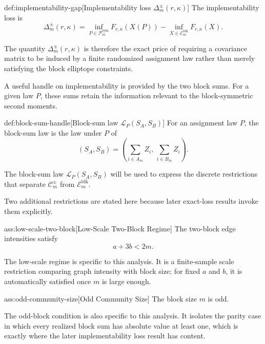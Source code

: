 \documentclass[11pt]{article}
\begin{document}
\begin{definitionv}{def:implementability-gap}[Implementability loss $\Delta_m^{\pm}(r,\kappa)$]
The implementability loss is
\[
\Delta_m^{\pm}(r,\kappa)
=
\inf_{P\in \mathcal P_m^{\mathrm{sym}}}
F_{r,\kappa}(X(P))
-
\inf_{X\in \mathcal E_m^{\mathrm{blk}}}
F_{r,\kappa}(X).
\]
\end{definitionv}

The quantity \ensuremath{\Delta_m^{\pm}(r,\kappa)} is therefore the exact price of requiring a covariance matrix to be induced by a finite randomized assignment law rather than merely satisfying the block elliptope constraints.

A useful handle on implementability is provided by the two block sums. For a given law \(P\), these sums retain the information relevant to the block-symmetric second moments.

\begin{definitionv}{def:block-sum-handle}[Block-sum law $\mathcal L_P(S_A,S_B)$]
For an assignment law $P$, the block-sum law is the law under $P$ of
\[
(S_A,S_B)
=
\left(
\sum_{i\in A_m} Z_i,\,
\sum_{i\in B_m} Z_i
\right).
\]
\end{definitionv}

The block-sum law \(\mathcal L_P(S_A,S_B)\) will be used to express the discrete restrictions that separate \(\mathcal C_m^{\pm}\) from \(\mathcal E_m^{\mathrm{blk}}\).

Two additional restrictions are stated here because later exact-loss results invoke them explicitly.

\begin{assumptionv}{ass:low-scale-two-block}[Low-Scale Two-Block Regime]
The two-block edge intensities satisfy
\[
a+3b<2m.
\]
\end{assumptionv}

The low-scale regime is specific to this analysis. It is a finite-sample scale restriction comparing graph intensity with block size; for fixed \(a\) and \(b\), it is automatically satisfied once \(m\) is large enough.

\begin{assumptionv}{ass:odd-community-size}[Odd Community Size]
The block size \(m\) is odd.
\end{assumptionv}

The odd-block condition is also specific to this analysis. It isolates the parity case in which every realized block sum has absolute value at least one, which is exactly where the later implementability loss result has content.
\end{document}
